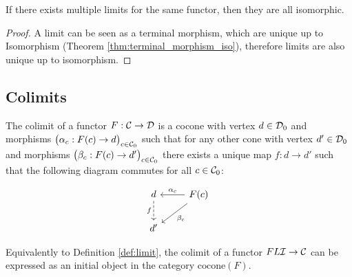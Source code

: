 \begin{theorem}
	If there exists multiple limits for the same functor, then they are all
	isomorphic.

	\begin{proof}
		A limit can be seen as a terminal morphism, which are unique up to
		Isomorphism (Theorem \ref{thm:terminal_morphism_iso}), therefore limits are
		also unique up to isomorphism.
	\end{proof}
\end{theorem}

\subsection{Colimits}

\begin{definition}
	The colimit of a functor $F:\mathcal{C}\to \mathcal{D}$ is a cocone with vertex $d\in \mathcal{D}_0$ and
	morphisms $\big(\alpha_c: F(c)\to d\big)_{c\in \mathcal{C}_0}$ such that for any other
	cone with vertex $d'\in \mathcal{D}_0$ and morphisms $\big(\beta_c: F(c)\to
	d'\big)_{c\in \mathcal{C}_0}$ there exists a unique map $f:d\to d'$ such that the
	following diagram commutes for all $c\in \mathcal{C}_0$:
	\parencite{leinster:basic_category_theory}

	\[\begin{tikzcd}[ampersand replacement=\&]
		d \& {F(c)} \\
		{d'}
		\arrow["{\alpha_c}"', from=1-2, to=1-1]
		\arrow["{\beta_c}", from=1-2, to=2-1]
		\arrow["f"', dashed, from=1-1, to=2-1]
	\end{tikzcd}\]
\end{definition}

\begin{definition}
	Equivalently to Definition \ref{def:limit}, the colimit of a functor $FL\mathcal{I}\to
	\mathcal{C}$ can be expressed as an initial object in the category
	$\mathrm{cocone}(F)$.
\end{definition}

